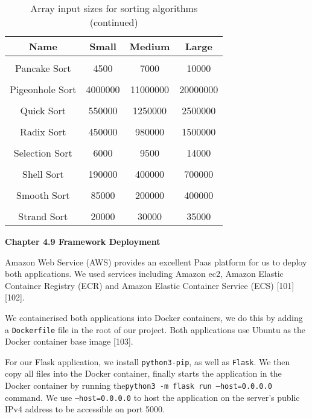 \begin{table}[h!]
\centering
\begin{tabular}{||c c c c||} 
\hline
Name & Small & Medium & Large \\ [1ex] 
\hline\hline
 & & & \\
Pancake Sort & 4500 & 7000 & 10000 \\
 & & & \\
Pigeonhole Sort & 4000000 & 11000000 & 20000000 \\ 
 & & & \\
Quick Sort & 550000 & 1250000 & 2500000 \\ 
 & & & \\
Radix Sort & 450000 & 980000 & 1500000 \\
 & & & \\
Selection Sort & 6000 & 9500 & 14000 \\ 
 & & & \\
Shell Sort & 190000 & 400000 & 700000 \\ 
 & & & \\
Smooth Sort & 85000 & 200000 & 400000 \\ 
 & & & \\
Strand Sort & 20000 & 30000 & 35000 \\ [1ex]
\hline
\end{tabular}
\caption{Array input sizes for sorting algorithms (continued)}
\label{table:time_complexity_2}
\end{table}
\bigskip

\bigskip
\textbf{{\Large Chapter 4.9 Framework Deployment}}

Amazon Web Service (AWS) provides an excellent Paas platform for us to deploy both applications. We used services including Amazon ec2, Amazon Elastic Container Registry (ECR) and Amazon Elastic Container Service (ECS) [101] [102].

We containerised both applications into Docker containers, we do this by adding a \texttt{Dockerfile} file in the root of our project. Both applications use Ubuntu as the Docker container base image [103].

For our Flask application, we install \texttt{python3-pip}, as well as \texttt{Flask}. We then copy all files into the Docker container, finally starts the application in the Docker container by running the\newline\texttt{python3 -m flask run --host=0.0.0.0} command. We use \texttt{--host=0.0.0.0} to host the application on the server's public IPv4 address to be accessible on port 5000.

